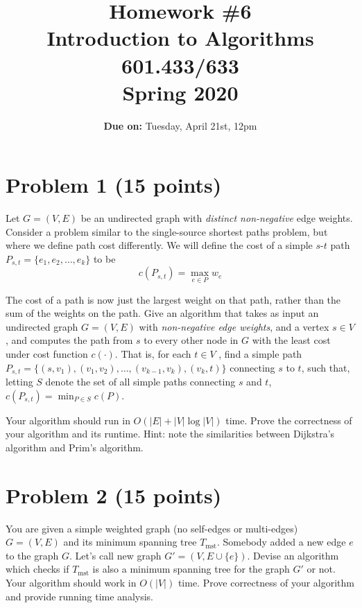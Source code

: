 \documentclass[letterpaper, 11pt]{article}
\begin{document}
\title{Homework \#6 \\ Introduction to Algorithms \\ 601.433/633 \\ Spring 2020}
\author{\textbf{Due on:} Tuesday, April 21st, 12pm \\}
\date{}
\vspace{-1cm}
\maketitle

\section{Problem 1 (15 points)}
Let $G = (V, E)$ be an undirected graph with \emph{distinct non-negative} edge weights.
Consider a problem similar to the single-source shortest paths problem, but where
we define path cost differently. We will define the cost of a simple $s$-$t$ path $P_{s,t} =
\{e_1, e_2, \ldots, e_k\}$ to be $$c(P_{s,t}) = \max_{e \in P} w_e$$

The cost of a path is now just the largest weight on that path, rather than the
sum of the weights on the path. Give an algorithm that takes as input an undirected
graph $G = (V, E)$ with \emph{non-negative edge weights}, and a vertex $s \in V$, and
computes the path from $s$ to every other node in $G$ with the least cost under cost
function $c(\cdot)$. That is, for each $t \in V$ , find a simple path $P_{s,t} =
\{(s, v_1), (v_1, v_2), \dots, (v_{k-1}, v_k), (v_k, t)\}$ connecting $s$ to $t$, such that, letting $S$ denote the set of all simple paths connecting $s$ and $t$, $c(P_{s, t}) = \min_{P\in S} c(P)$. 

Your algorithm should run in $O(|E| + |V| \log |V|)$ time. Prove the correctness of your algorithm and its runtime. Hint: note the similarities between Dijkstra's algorithm and Prim's
algorithm.





\section{Problem 2 (15 points)}

You are given a simple weighted graph (no self-edges or multi-edges) $G = (V, E)$ and its minimum spanning tree $T_{\text{mst}}$. Somebody added a new edge $e$ to the graph $G$. Let's call new graph $G' = (V, E\cup \{e\})$. Devise an algorithm which checks if $T_{\text{mst}}$ is also a minimum spanning tree for the graph $G'$ or not. Your algorithm should work in $O(|V|)$ time. Prove correctness of your algorithm and provide running time analysis.
\end{document}
